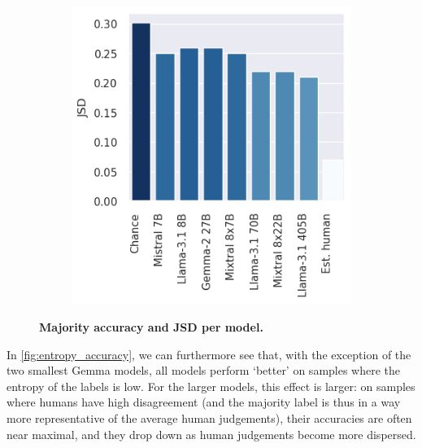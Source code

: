 \begin{figure}
\begin{subfigure}[b]{0.33\textwidth}
        \includegraphics[width=\textwidth]{figures/jsd_per_model}
        \caption{}
        \label{fig:jsd_per_model}
    \end{subfigure}
\caption{\textbf{Majority accuracy and JSD per model.} }
\end{figure}

In \cref{fig:entropy_accuracy}, we can furthermore see that, with the exception of the two smallest Gemma models, all models perform `better' on samples where the entropy of the labels is low.
For the larger models, this effect is larger: on samples where humans have high disagreement (and the majority label is thus in a way more representative of the average human judgements), their accuracies are often near maximal, and they drop down as human judgements become more dispersed.
 


